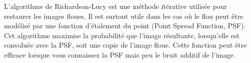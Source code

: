L'algorithme de Richardson-Lucy est une méthode itérative utilisée pour restaurer les images floues. 
Il est surtout utile dans les cas où le flou peut être modélisé par une fonction d'étalement du point (Point Spread Function, PSF). 
Cet algorithme maximise la probabilité que l'image résultante, lorsqu'elle est convoluée avec la PSF, soit une copie de l'image floue. 
Cette fonction peut être efficace lorsque vous connaissez la PSF mais peu le bruit additif de l'image.